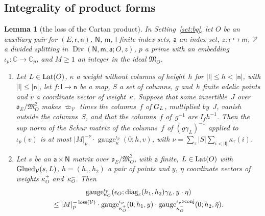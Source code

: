 \documentclass[11pt,a4paper]{article}
\newcommand{\m}[1]{\mbox{$#1$}}        %
\theoremstyle{plainx}
\newtheorem{lemma}[theorem]{Lemma}
\theoremstyle{uprightx}
\newcommand{\CC}{\mathbb{C}}
\newcommand{\ix}[1]{\mathsf{#1}}
\newcommand{\OEr}{\mathfrak{o}_E}
\newcommand{\gau}[5]{\operatorname{gauge}^{#1}_{#2}(#3;#4,#5)}
\begin{document}
\subsection*{Integrality of product forms}
\begin{lemma}[the loss of the Cartan product]\label{l:cartan}
In Setting~\ref{set:bg}, let $O$ be an auxiliary pair for \m{(E,\ix r,\ix n)}, \m{\ix N}, \m{\ix m}, \m{\ix l} finite
index sets, \m{\ix a} an index set, \m{z\colon\ix r\hookrightarrow\ix m}, $\mathcal{V}$ a divided splitting in
\m{\operatorname{Div}(\ix N,\ix m,\ix a;O,z)}, $p$ a prime with an embedding \m{\iota_p\colon\CC\to\CC_p}, and \m{M\ge1} an
integer in the ideal \m{\mathfrak{M}_O}.
\begin{enumerate}[label=\textup{(\alph*)},leftmargin=2.3em,itemsep=2pt]
\item Let \m{L\in\DividedLattice{O}}, $\kappa$ a weight without columns of height~$h$ for
\m{|\ix l|\le h<|\ix n|}, with \m{|\ix l|\le|\ix n|}, let \m{f\colon\ix l\to\ix n} be a map, $S$ a set of columns,
$g$ and~$h$ finite adelic points and $v$ a coordinate vector of weight~$\kappa$. Suppose that some invertible~$J$
over \m{\OEr/\mathfrak{M}_O^{2}} makes \m{\bar\varpi_{\mathcal{V}}} times the columns~$f$ of \m{\reducedInverse{L}}, multiplied
by~$J$, vanish outside the columns~$S$, and that the columns~$f$ of~$g^{-1}$ are \m{I_fh^{-1}}. Then the sup norm
of the Schur matrix of the columns~$f$ of \m{(g\gamma_L)^{-1}} applied to \m{\iota_p(v)} is at most
\m{|M|_p^{-\nu}\cdot\gau{\iota_p}{\kappa}{0}{h}{v}}, with \m{\nu=\sum_\tau|S|\sum_{i<|\ix l|}\kappa_\tau(i)}.
\item Let $s$ be an \m{\ix a\times\ix N} matrix over \m{\OEr/\mathfrak{M}_O^{2}}, with $\ix a$ finite,
\m{L\in\DividedLattice{O}} with \m{\IsGlued{\mathcal{V}}{s}{L}}, \m{h=(h_1,h_2)} a pair of points and $y$, $\eta$
coordinate vectors of weights $\kappa^{+}_O$ and~$\kappa^{-}_O$. Then
\begin{multline*}
\gau{\iota_p}{\kappa_O}{\epsilon_O}{\operatorname{diag}_\varepsilon(h_1,h_2)\gamma_L}{y\cdot\eta}\\
\le|M|_p^{-\loss{\mathcal{V}}}\cdot
\gau{\iota_p}{\kappa^{+}_O}{0}{h_1}{y}\cdot\gau{\iota_p\circ\mathrm{conj}}{\kappa^{-}_O}{0}{h_2}{\bar\eta}.
\end{multline*}
\end{enumerate}
\end{lemma}
\end{document}
